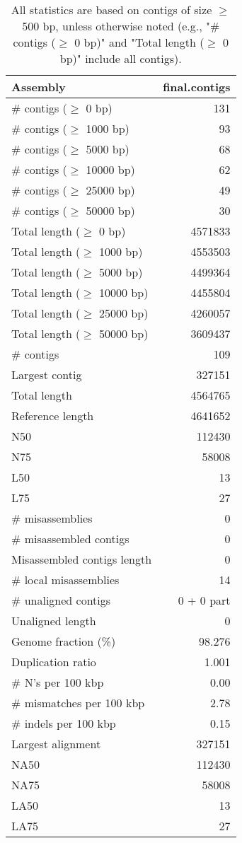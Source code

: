 \documentclass[12pt,a4paper]{article}
\begin{document}
\begin{table}[ht]
\begin{center}
\caption{All statistics are based on contigs of size $\geq$ 500 bp, unless otherwise noted (e.g., "\# contigs ($\geq$ 0 bp)" and "Total length ($\geq$ 0 bp)" include all contigs).}
\begin{tabular}{|l*{1}{|r}|}
\hline
Assembly & final.contigs \\ \hline
\# contigs ($\geq$ 0 bp) & 131 \\ \hline
\# contigs ($\geq$ 1000 bp) & 93 \\ \hline
\# contigs ($\geq$ 5000 bp) & 68 \\ \hline
\# contigs ($\geq$ 10000 bp) & 62 \\ \hline
\# contigs ($\geq$ 25000 bp) & 49 \\ \hline
\# contigs ($\geq$ 50000 bp) & 30 \\ \hline
Total length ($\geq$ 0 bp) & 4571833 \\ \hline
Total length ($\geq$ 1000 bp) & 4553503 \\ \hline
Total length ($\geq$ 5000 bp) & 4499364 \\ \hline
Total length ($\geq$ 10000 bp) & 4455804 \\ \hline
Total length ($\geq$ 25000 bp) & 4260057 \\ \hline
Total length ($\geq$ 50000 bp) & 3609437 \\ \hline
\# contigs & 109 \\ \hline
Largest contig & 327151 \\ \hline
Total length & 4564765 \\ \hline
Reference length & 4641652 \\ \hline
N50 & 112430 \\ \hline
N75 & 58008 \\ \hline
L50 & 13 \\ \hline
L75 & 27 \\ \hline
\# misassemblies & 0 \\ \hline
\# misassembled contigs & 0 \\ \hline
Misassembled contigs length & 0 \\ \hline
\# local misassemblies & 14 \\ \hline
\# unaligned contigs & 0 + 0 part \\ \hline
Unaligned length & 0 \\ \hline
Genome fraction (\%) & 98.276 \\ \hline
Duplication ratio & 1.001 \\ \hline
\# N's per 100 kbp & 0.00 \\ \hline
\# mismatches per 100 kbp & 2.78 \\ \hline
\# indels per 100 kbp & 0.15 \\ \hline
Largest alignment & 327151 \\ \hline
NA50 & 112430 \\ \hline
NA75 & 58008 \\ \hline
LA50 & 13 \\ \hline
LA75 & 27 \\ \hline
\end{tabular}
\end{center}
\end{table}
\end{document}
